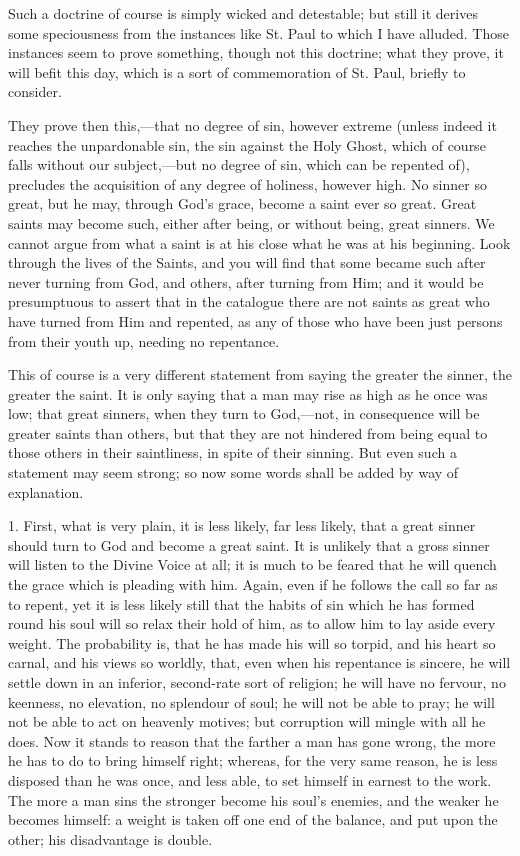 Such a doctrine of course is simply wicked and detestable; but
still it derives some speciousness from the instances like St. Paul to
which I have alluded. Those instances seem to prove something, though
not this doctrine; what they prove, it will befit this day,
which is a sort of commemoration of St. Paul, briefly to consider.

They prove then this,—that no degree of sin, however extreme
(unless indeed it reaches the unpardonable sin, the sin against the
Holy Ghost, which of course falls without our subject,—but no degree
of sin, which can be repented of), precludes the acquisition of any
degree of holiness, however high. No sinner so great, but he may,
through God's grace, become a saint ever so great. Great saints may
become such, either after being, or without being, great sinners. We
cannot argue from what a saint is at his close what he was at his
beginning. Look through the lives of the Saints, and you will find
that some became such after never turning from God, and others, after
turning from Him; and it would be presumptuous to assert that in the
catalogue there are not saints as great who have turned from Him and
repented, as any of those who have been just persons from their youth
up, needing no repentance.

This of course is a very different statement from saying the
greater the sinner, the greater the saint. It is only saying that a
man may rise as high as he once was low; that great sinners, when they
turn to God,—not, in consequence will be greater saints than others,
but that they are not hindered from being equal to those others in
their saintliness, in spite of their sinning. But even such a
statement may seem strong; so now some words shall be added by way of
explanation.

1. First, what is very plain, it is less likely, far less likely,
that a great sinner should turn to God and become a great saint. It is
unlikely that a gross sinner will listen to the Divine Voice at all;
it is much to be feared that he will quench the grace which is
pleading with him. Again, even if he follows the call so far as to
repent, yet it is less likely still that the habits of sin which he
has formed round his soul will so relax their hold of him, as to allow
him to lay aside every weight. The probability is, that he has made
his will so torpid, and his heart so carnal, and his views so worldly,
that, even when his repentance is sincere, he will settle down in an
inferior, second-rate sort of religion; he will have no fervour, no
keenness, no elevation, no splendour of soul; he will not be able to
pray; he will not be able to act on heavenly motives; but corruption
will mingle with all he does. Now it stands to reason that the farther
a man has gone wrong, the more he has to do to bring himself right;
whereas, for the very same reason, he is less disposed than he was
once, and less able, to set himself in earnest to the work. The more a
man sins the stronger become his soul's enemies, and the weaker he
becomes himself: a weight is taken off one end of the balance, and put
upon the other; his disadvantage is double.

